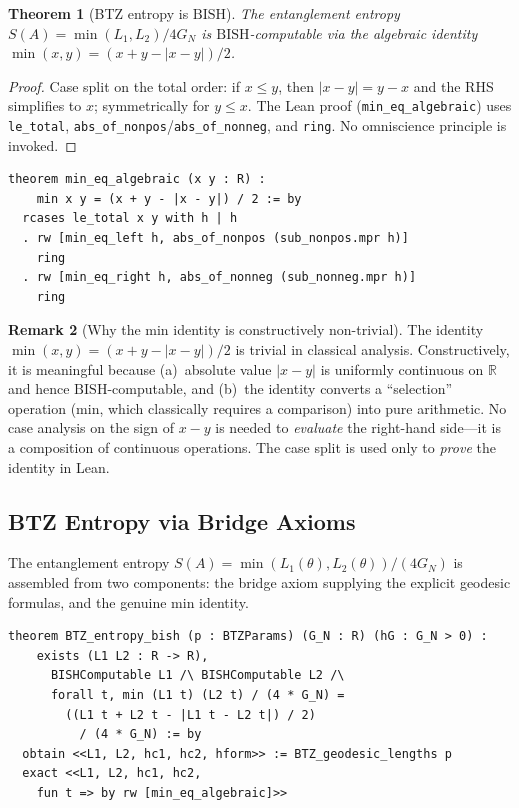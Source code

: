 \documentclass[11pt,a4paper]{article}
\theoremstyle{plain}
\newtheorem{theorem}{Theorem}[section]
\theoremstyle{definition}
\newtheorem{remark}[theorem]{Remark}
\newcommand{\RR}{\mathbb{R}}
\newcommand{\BISH}{\ensuremath{\mathrm{BISH}}}
\newcommand{\GN}{\ensuremath{G_N}}
\begin{document}
\begin{theorem}[BTZ entropy is $\BISH$]\label{thm:btz-bish}
The entanglement entropy $S(A) = \min(L_1, L_2) / 4\GN$ is
$\BISH$-computable via the algebraic identity
$\min(x,y) = (x + y - |x - y|)/2$.
\end{theorem}

\begin{proof}
Case split on the total order: if $x \le y$, then $|x-y| = y-x$ and
the RHS simplifies to $x$; symmetrically for $y \le x$.
The Lean proof (\texttt{min\_eq\_algebraic}) uses \texttt{le\_total},
\texttt{abs\_of\_nonpos}/\texttt{abs\_of\_nonneg}, and \texttt{ring}.
No omniscience principle is invoked.
\end{proof}

\begin{lstlisting}[caption={The min identity: \texttt{ThermalBTZ.lean} --- genuine Lean proof}]
theorem min_eq_algebraic (x y : R) :
    min x y = (x + y - |x - y|) / 2 := by
  rcases le_total x y with h | h
  . rw [min_eq_left h, abs_of_nonpos (sub_nonpos.mpr h)]
    ring
  . rw [min_eq_right h, abs_of_nonneg (sub_nonneg.mpr h)]
    ring
\end{lstlisting}

\begin{remark}[Why the min identity is constructively non-trivial]
The identity $\min(x,y) = (x+y-|x-y|)/2$ is trivial in classical
analysis.  Constructively, it is meaningful because (a)~absolute
value $|x-y|$ is uniformly continuous on $\RR$ and hence $\BISH$-computable,
and (b)~the identity converts a ``selection'' operation
(min, which classically requires a comparison) into pure arithmetic.
No case analysis on the sign of $x-y$ is needed to \emph{evaluate}
the right-hand side---it is a composition of continuous operations.
The case split is used only to \emph{prove} the identity in Lean.
\end{remark}

\subsection{BTZ Entropy via Bridge Axioms}

The entanglement entropy $S(A) = \min(L_1(\theta), L_2(\theta))/(4\GN)$
is assembled from two components: the bridge axiom supplying the
explicit geodesic formulas, and the genuine min identity.

\begin{lstlisting}[caption={BTZ entropy assembly: \texttt{ThermalBTZ.lean}}]
theorem BTZ_entropy_bish (p : BTZParams) (G_N : R) (hG : G_N > 0) :
    exists (L1 L2 : R -> R),
      BISHComputable L1 /\ BISHComputable L2 /\
      forall t, min (L1 t) (L2 t) / (4 * G_N) =
        ((L1 t + L2 t - |L1 t - L2 t|) / 2)
          / (4 * G_N) := by
  obtain <<L1, L2, hc1, hc2, hform>> := BTZ_geodesic_lengths p
  exact <<L1, L2, hc1, hc2,
    fun t => by rw [min_eq_algebraic]>>
\end{lstlisting}
\end{document}

